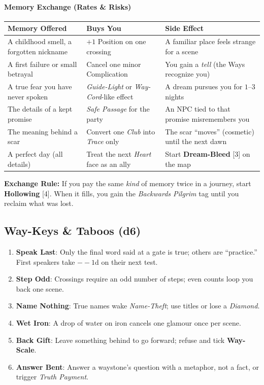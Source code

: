\paragraph{Memory Exchange (Rates \& Risks)}
\begin{tabular}{p{} p{} p{}}
\textbf{Memory Offered} & \textbf{Buys You} & \textbf{Side Effect} \\
\hline
A childhood smell, a forgotten nickname & $+1$ Position on one crossing & A familiar place feels strange for a scene \\
A first failure or small betrayal & Cancel one minor Complication & You gain a \emph{tell} (the Ways recognize you) \\
A true fear you have never spoken & \emph{Guide-Light} or \emph{Way-Cord}-like effect & A dream pursues you for $1$--$3$ nights \\
The details of a kept promise & \emph{Safe Passage} for the party & An NPC tied to that promise misremembers you \\
The meaning behind a scar & Convert one \emph{Club} into \emph{Trace} only & The scar ``moves'' (cosmetic) until the next dawn \\
A perfect day (all details) & Treat the next \emph{Heart} face as an ally & Start \textbf{Dream-Bleed} [3] on the map \\
\end{tabular}

\medskip
\textbf{Exchange Rule:} If you pay the same \emph{kind} of memory twice in a journey, start \textbf{Hollowing} [4]. When it fills, you gain the \emph{Backwards Pilgrim} tag until you reclaim what was lost.

\subsection*{Way-Keys \& Taboos (d6)}
\begin{enumerate}
\item \textbf{Speak Last}: Only the final word said at a gate is true; others are ``practice.'' First speakers take $--1$d on their next test.
\item \textbf{Step Odd}: Crossings require an odd number of steps; even counts loop you back one scene.
\item \textbf{Name Nothing}: True names wake \emph{Name-Theft}; use titles or lose a \emph{Diamond}.
\item \textbf{Wet Iron}: A drop of water on iron cancels one glamour once per scene.
\item \textbf{Back Gift}: Leave something behind to go forward; refuse and tick \textbf{Way-Scale}.
\item \textbf{Answer Bent}: Answer a waystone's question with a metaphor, not a fact, or trigger \emph{Truth Payment}.
\end{enumerate}

